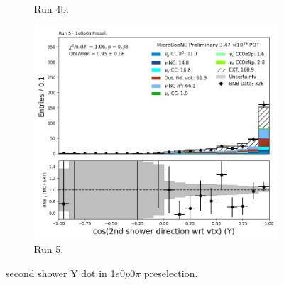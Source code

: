 \begin{figure}[H]
\begin{subfigure}[t]{0.32\linewidth}
        \caption{Run 4b.}
    \end{subfigure}%
    \hspace{0.2cm}%
    \begin{subfigure}[t]{0.32\linewidth}
        \includegraphics[width=\linewidth]{technote/Appendix_Preselection/Figures/1e0p0pi/Run5/secondshower_Y_dot_Run5_1e0p0pi_Presel.png}
        \caption{Run 5.}
    \end{subfigure}
    \caption{second shower Y dot in 1$e$0$p$0$\pi$ preselection.}
\end{figure}

